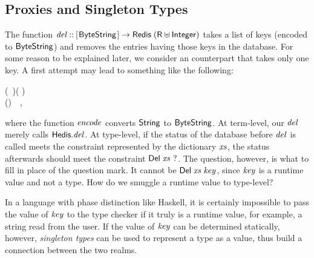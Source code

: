 \subsection{Proxies and Singleton Types}
\label{sec:proxy-key}

The \Hedis{} function \ensuremath{\Varid{del}\mathbin{::}[\mskip1.5mu \Conid{ByteString}\mskip1.5mu]\to \Conid{Redis}\;(\Conid{R} \uplus \Conid{Integer})} takes a list of keys (encoded to \ensuremath{\Conid{ByteString}}) and removes the entries having those
keys in the database. For some reason to be explained later, we consider an \Edis{}
counterpart that takes only one key. A first attempt may lead to something like
the following:
\begin{hscode}\SaveRestoreHook
{}%
%
\>[B]{}\mathbin{::}\to {}\;\;(\;~)\;( \uplus {}){}\<[E]%
\\
\>[B]{}\;\mathrel{=}\;()~~,{}\<[E]%
\ColumnHook
\end{hscode}\resethooks
where the function \ensuremath{\Varid{encode}} converts \ensuremath{\Conid{String}} to \ensuremath{\Conid{ByteString}}. At term-level,
our \ensuremath{\Varid{del}} merely calls \ensuremath{\Varid{\Conid{Hedis}.del}}. At type-level, if the status of the database
before \ensuremath{\Varid{del}} is called meets the constraint represented by the dictionary
\ensuremath{\Varid{xs}}, the status afterwards should meet the constraint \ensuremath{\Conid{Del}\;\Varid{xs}~\mathbin{?}}. The question, however, is what to fill in place of the question mark. It cannot be
\ensuremath{\Conid{Del}\;\Varid{xs}\;\Varid{key}}, since \ensuremath{\Varid{key}} is a runtime value and not a type. How do we smuggle
a runtime value to type-level?

In a language with phase distinction like Haskell, it is certainly impossible
to pass the value of \ensuremath{\Varid{key}} to the type checker if it truly is a runtime value,
for example, a string read from the user. If the value of \ensuremath{\Varid{key}} can be
determined statically, however, {\em singleton types} can be used to represent a
type as a value, thus build a connection between the two realms.

